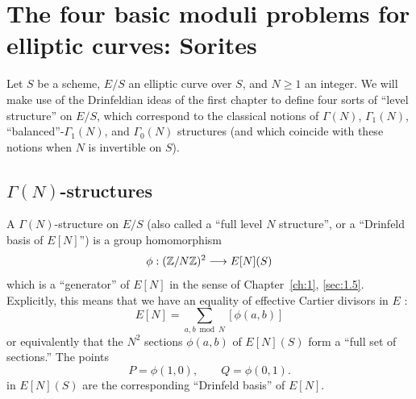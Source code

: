 \chapter{The four basic moduli problems for elliptic curves: Sorites}
\label{ch:3}

Let $S$ be a scheme, $E/S$ an elliptic curve over $S$, and $N \ge 1$ an integer. We will make use of the Drinfeldian ideas of the first chapter to define four sorts of ``level structure'' on $E/S$, which correspond to the classical notions of $\Gamma(N)$, $\Gamma_1(N)$, ``balanced''-$\Gamma_1(N)$, and $\Gamma_0(N)$ structures (and which coincide with these notions when $N$ is invertible on $S$).

\section{$\Gamma(N)$-structures}
\label{sec:3.1}

A $\Gamma(N)$-structure on $E/S$ (also called a ``full level $N$ structure'', or a ``Drinfeld basis of $E[N]$'') is a group homomorphism
\begin{equation}\label{eq:3.1.1}
\phi : (\mathbb{Z}/N\mathbb{Z})^2 \longrightarrow E[N](S)
\end{equation}
which is a ``generator'' of $E[N]$ in the sense of Chapter~\ref{ch:1}, \ref{sec:1.5}. Explicitly, this means that we have an equality of effective Cartier divisors in $E$ :
\begin{equation}\label{eq:3.1.2}
E[N] = \sum_{a, b \bmod N} [\phi(a,b)]
\end{equation}
or equivalently that the $N^2$ sections $\phi(a,b)$ of $E[N](S)$ form a ``full set of sections.'' The points
\[
P = \phi(1,0), \qquad Q = \phi(0,1).
\]
in $E[N](S)$ are the corresponding ``Drinfeld basis'' of $E[N]$.

